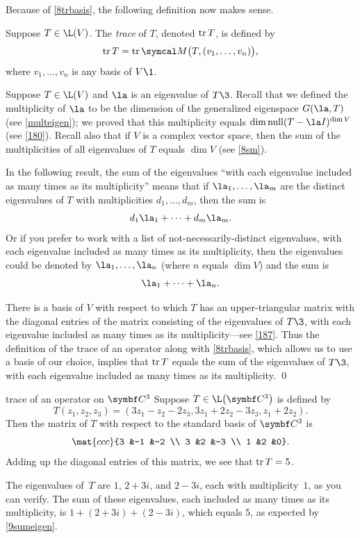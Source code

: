 Because of \ref{8trbasis}, the following definition now makes sense.

{Suppose $T \in \L(V)$. The\/ \emph{trace} of $T$, denoted $\operatorname{tr} T$, is defined by
\[
\tr T = \tr \M\paren[\big]{ T, (v_1, \ldots, v_n) },
\]
where $v_1, \ldots, v_n$ is any basis of $V\1$.}

Suppose $T \in \L(V)$ and $\la$ is an eigenvalue of $T\3$. Recall that we defined the multiplicity of $\la$ to be the dimension of the generalized eigenspace $G(\la, T)$ (see \ref{multeigen});  we proved that this multiplicity equals $\dim \ker(T - \la I)^{\dim V}$ (see \ref{180}). Recall also that if $V$ is a complex vector space, then the sum of the multiplicities of all eigenvalues of $T$ equals $\dim V$ (see \ref{8sm}).

In the following result, the sum of the eigenvalues ``with each eigenvalue included as many times as its multiplicity'' means that if
$\la_1, \dots, \la_m$ are the distinct eigenvalues of $T$ with multiplicities $d_1, \dots, d_m$, then the sum is
\[
d_1 \la_1 + \dots + d_m \la_m.
\]
Or if you prefer to work with a list of not-necessarily-distinct eigenvalues, with each eigenvalue included as many times as its multiplicity, then the eigenvalues could be denoted by $\la_1, \dots, \la_n$ (where $n$ equals $\dim V$) and the sum is
\[
\la_1 + \dots + \la_n.
\]

\pagebreak[3]


\proof
There is a basis of $V$ with respect to which $T$ has an upper-triangular matrix with the diagonal entries of the matrix consisting of the eigenvalues of $T\3$, with each eigenvalue included as many times as its multiplicity---see \ref{187}. Thus the definition of the trace of an operator along with \ref{8trbasis}, which allows us to use a basis of our choice, implies that $\operatorname{tr} T$ equals the sum of the eigenvalues of $T\3$, with each eigenvalue included as many times as its multiplicity.
\qed

\begin{example}{trace of an operator on\/ $\C3$}
Suppose $T \in \L\paren[\big]{\C{3}}$ is defined by
\[
T(z_1, z_2, z_3) = (3z_1 - z_2 - 2z_3, 3z_1 + 2z_2 - 3z_3, z_1 + 2z_2).
\]
Then the matrix of $T$ with respect to the standard basis of $\C3$ is
\[
\mat{ccc}{3 &-1 &-2 \\ 3 &2 &-3 \\ 1 &2 &0}.
\]
Adding up the diagonal entries of this matrix, we see that $\operatorname{tr} T = 5$.

The eigenvalues of~$T$ are $1$, $2+3i$, and $2-3i$, each with multiplicity~$1$, as you can verify. The sum of these eigenvalues, each included as many times as its multiplicity, is $1 + (2 + 3i) + (2 - 3i)$, which equals $5$, as expected by \ref{9sumeigen}.
\end{example}

